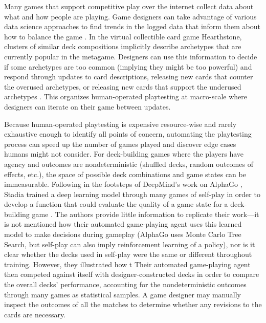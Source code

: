 \documentclass[letterpaper]{article} %
\begin{document}
Many games that support competitive
play over the internet collect data about what and how people are playing.  Game
designers can take advantage of various data science approaches to find trends in
the logged data that inform them about how to balance the game \cite{nce-gameAIpro2}.
In the virtual collectible card game Hearthstone, clusters of similar deck
compositions implicitly describe archetypes that are currently popular in the
metagame.  Designers can use this information to decide if some archetypes are too
common (implying they might be too powerful) and respond through updates to card
descriptions, releasing new cards that counter the overused archetypes, or
releasing new cards that support the underused archetypes \cite{blizzard-gamebalancetalk-keg2019}.
This %
organizes human-operated playtesting at macro-scale where designers
can iterate on their game between updates. %

Because human-operated playtesting is expensive resource-wise and rarely
exhaustive enough to identify all points of concern, automating the playtesting
process can speed up the number of games played and discover edge cases humans
might not consider.  For deck-building games where the players have
agency and outcomes are nondeterministic (shuffled decks, random outcomes of effects,
etc.), the space of possible deck combinations and game states can be immeasurable.
Following in the footsteps of DeepMind's work on AlphaGo \cite{alphago}, Stadia
trained a deep learning model through many games of self-play in order to develop
a function that could evaluate the quality of a game state for a %
deck-building
game \cite{chimera-mlagent}. %
The authors provide
little information to replicate their work---it is not mentioned how their automated
game-playing agent uses this learned model to make decisions during gameplay
(AlphaGo uses Monte Carlo Tree Search, but self-play can also imply reinforcement
learning of a policy), nor is it clear whether the decks used in self-play were
the same or different throughout training.  However, they illustrated how t
\fi
Their
automated game-playing agent %
then competed against itself with %
designer-constructed decks in order to compare the overall decks' performance,
accounting for the nondeterministic outcomes through many games as statistical
samples.  A game designer may manually inspect the outcomes of all the matches
to determine whether any revisions to the cards are necessary.
\end{document}
